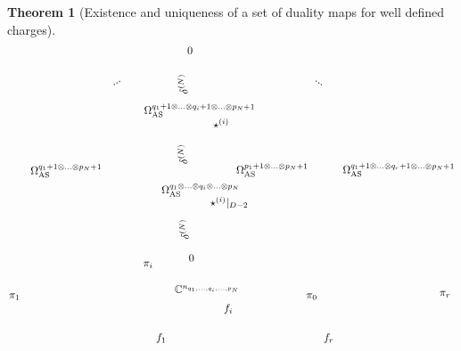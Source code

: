 \documentclass[a4paper,12pt]{article}
\newtheorem{Theorem}{Theorem}[section]
\begin{document}
\begin{Theorem}[Existence and uniqueness of a set of duality maps for well defined charges]
\begin{equation}
\begin{tikzpicture}[x=0.62pt,y=0.75pt,yscale=-1,xscale=1]
\draw (504.9,394.31) node [anchor=north west][inner sep=0.75pt]    {$f_{r}$};
\draw (256.06,394.31) node [anchor=north west][inner sep=0.75pt]    {$f_{1}$};
\draw (375.27,185.42) node [anchor=north west][inner sep=0.75pt]  [rotate=-0.36]  {$\Omega _{\textnormal{AS}}^{p_{1} +1\otimes ...\otimes p_{N} +1}$};
\draw (69.89,186.29) node [anchor=north west][inner sep=0.75pt]  [rotate=-0.36]  {$\Omega _{\textnormal{AS}}^{q_{1} +1\otimes ...\otimes p_{N} +1}$};
\draw (341.05,130.28) node [anchor=north west][inner sep=0.75pt]    {$\star ^{( i)}$};
\draw (336.58,226.06) node [anchor=north west][inner sep=0.75pt]    {$\star ^{( i)} |_{D-2}$};
\draw (356.73,358.31) node [anchor=north west][inner sep=0.75pt]    {$f_{i}$};
\draw (290.55,281.37) node [anchor=north west][inner sep=0.75pt]  [rotate=-268.92]  {$\delta ^{( N)}$};
\draw (304.7,297.67) node [anchor=north west][inner sep=0.75pt]  [rotate=-359.84]  {$0$};
\draw (264.33,210.17) node [anchor=north west][inner sep=0.75pt]  [rotate=-0.36]  {$\Omega _{\textnormal{AS}}^{q_{1} \otimes ...\otimes q_{i} \otimes ...\otimes p_{N}}$};
\draw (302.56,42.9) node [anchor=north west][inner sep=0.75pt]  [rotate=-0.45]  {$0$};
\draw (288.3,189.21) node [anchor=north west][inner sep=0.75pt]  [rotate=-268.92]  {$\delta ^{( N)}$};
\draw (288.62,103.13) node [anchor=north west][inner sep=0.75pt]  [rotate=-268.92]  {$\delta ^{( N)}$};
\draw (283.55,335.4) node [anchor=north west][inner sep=0.75pt]    {$\mathbb{C}^{n_{q_{1} ,...,q_{i} ,...,p_{N}}}$};
\draw (191.38,90.04) node [anchor=north west][inner sep=0.75pt]  [rotate=-329.38]  {$...$};
\draw (493.8,82.66) node [anchor=north west][inner sep=0.75pt]  [rotate=-34.08]  {$...$};
\draw (238.33,112.17) node [anchor=north west][inner sep=0.75pt]  [rotate=-0.36]  {$\Omega _{\textnormal{AS}}^{q_{1} +1\otimes ...\otimes q_{i} +1\otimes ...\otimes p_{N} +1}$};
\draw (479,345.4) node [anchor=north west][inner sep=0.75pt]    {$\pi _{0}$};
\draw (677,342.4) node [anchor=north west][inner sep=0.75pt]    {$\pi _{r}$};
\draw (38,345.4) node [anchor=north west][inner sep=0.75pt]    {$\pi _{1}$};
\draw (237,306.4) node [anchor=north west][inner sep=0.75pt]    {$\pi _{i}$};
\draw (533.33,185.17) node [anchor=north west][inner sep=0.75pt]  [rotate=-0.36]  {$\Omega _{\textnormal{AS}}^{q_{1} +1\otimes ...\otimes q_{r} +1\otimes ...\otimes p_{N} +1}$};

\end{tikzpicture}
\end{equation}
\end{Theorem}
\end{document}
